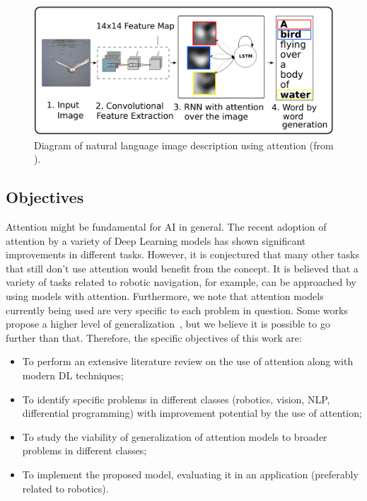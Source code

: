 \documentclass[article]{IEEEtran}
\begin{document}
\begin{figure}
\begin{center}
	\includegraphics[width=1.0\linewidth]{./img/img_captioning.png}
\caption{
    Diagram of natural language image description using attention
    (from \cite{ref:img-captioning}).
}
\label{fig:description}
\end{center}
\end{figure}

\subsection{Objectives}
Attention might be fundamental for AI in general.
The recent adoption of attention by a variety of Deep Learning models
has shown significant improvements in different tasks.
However, it is conjectured that many other tasks that still don't use
attention would benefit from the concept.
It is believed that a variety of tasks related to robotic navigation,
for example, can be approached by using models with attention.
Furthermore, we note that attention models currently being used
are very specific to each problem in question.
Some works propose a higher level of generalization~\cite{ref:recurr-models},
but we believe it is possible to go further than that.
Therefore, the specific objectives of this work are:
\begin{itemize}
    \item To perform an extensive literature review on the use of attention
        along with modern DL techniques;
    \item To identify specific problems in different classes
        (robotics, vision, NLP, differential programming) with
        improvement potential by the use of attention;
    \item To study the viability of generalization of attention models
        to broader problems in different classes;
    \item To implement the proposed model, evaluating it in an
        application (preferably related to robotics).
\end{itemize}
\end{document}
